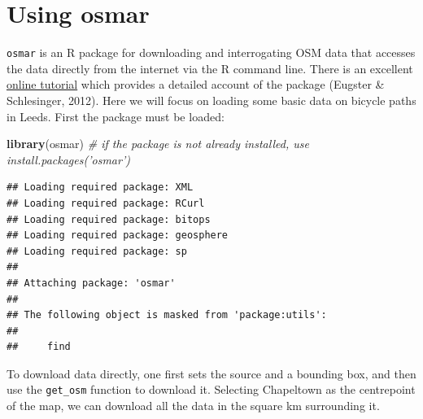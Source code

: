 \documentclass[]{article}
\newenvironment{Shaded}{}{}
\newcommand{\KeywordTok}[1]{\textcolor[rgb]{0.00,0.44,0.13}{\textbf{{#1}}}}
\newcommand{\CommentTok}[1]{\textcolor[rgb]{0.38,0.63,0.69}{\textit{{#1}}}}
\newcommand{\NormalTok}[1]{{#1}}
\begin{document}
\section{Using osmar}

\texttt{osmar} is an R package for downloading and interrogating OSM
data that accesses the data directly from the internet via the R command
line. There is an excellent
\href{http://journal.r-project.org/archive/2013-1/eugster-schlesinger.pdf}{online
tutorial} which provides a detailed account of the package (Eugster \&
Schlesinger, 2012). Here we will focus on loading some basic data on
bicycle paths in Leeds. First the package must be loaded:

\begin{Shaded}
\begin{Highlighting}[]
\KeywordTok{library}\NormalTok{(osmar)  }\CommentTok{# if the package is not already installed, use install.packages('osmar')}
\end{Highlighting}
\end{Shaded}
\begin{verbatim}
## Loading required package: XML
## Loading required package: RCurl
## Loading required package: bitops
## Loading required package: geosphere
## Loading required package: sp
## 
## Attaching package: 'osmar'
## 
## The following object is masked from 'package:utils':
## 
##     find
\end{verbatim}
To download data directly, one first sets the source and a bounding box,
and then use the \texttt{get\_osm} function to download it. Selecting
Chapeltown as the centrepoint of the map, we can download all the data
in the square km surrounding it.
\end{document}
